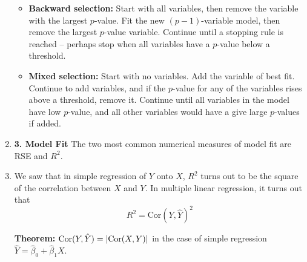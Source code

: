 \documentclass[10pt]{article}
\newcommand{\theorem}{\noindent \textbf{Theorem: }}
\newcommand{\Cor}{{\rm Cor}}
\begin{document}
\begin{enumerate}
\begin{itemize}
			\item \textbf{Backward selection:} Start with all variables, then remove the variable with the largest $p$-value.  Fit the new $(p-1)$-variable model, then remove the largest $p$-value variable.  Continue until a stopping rule is reached -- perhaps stop when all variables have a $p$-value below a threshold.
			\item \textbf{Mixed selection:} Start with no variables.  Add the variable of best fit.  Continue to add variables, and if the $p$-value for any of the variables rises above a threshold, remove it.  Continue until all variables in the model have low $p$-value, and all other variables would have a give large $p$-values if added.		 
		\end{itemize}
	\item \textbf{3. Model Fit} The two most common numerical measures of model fit are RSE and $R^2$.
	\item We saw that in simple regression of $Y$ onto $X$, $R^2$ turns out to be the square of the correlation between $X$ and $Y$.  In multiple linear regression, it turns out that $$R^2 = \text{Cor}(Y, \hat Y)^2$$
	{\color{brown} \theorem $\Cor(Y, \hat Y) = |\Cor(X,Y)|$ in the case of simple regression $\hat Y = \hat \beta_0 + \hat \beta_1 X$. 
	
}
\end{enumerate}
\end{document}
